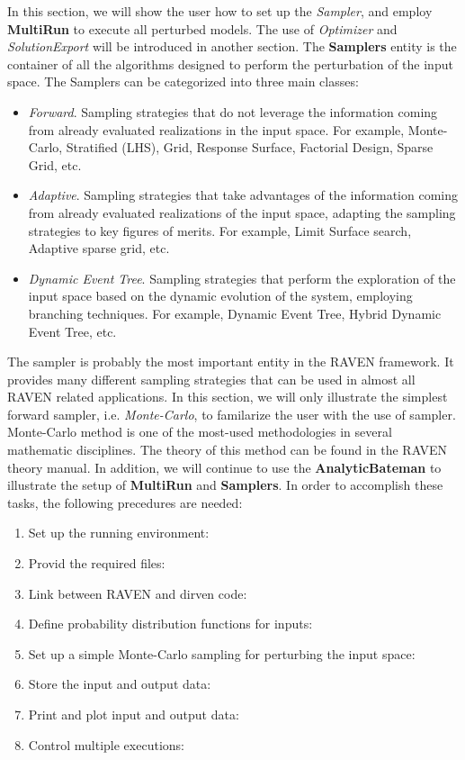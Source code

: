 In this section, we will show the user how to set up the \textit{Sampler}, and employ \textbf{MultiRun} to execute
all perturbed models. The use of \textit{Optimizer} and \textit{SolutionExport} will be introduced in another section.
The \textbf{Samplers}  entity is the container of all the algorithms designed to perform the perturbation of the
input space. The Samplers can be categorized into three main classes:

\begin{itemize}
  \item  \textit{Forward}. Sampling strategies that do not leverage the information coming from already evaluated
    realizations in the input space. For example, Monte-Carlo, Stratified (LHS), Grid, Response Surface, Factorial Design,
    Sparse Grid, etc.
  \item  \textit{Adaptive}. Sampling strategies that take advantages of the information coming from already evaluated
    realizations of the input space, adapting the sampling strategies to key figures of merits. For example, Limit Surface
    search, Adaptive sparse grid, etc.
  \item \textit{Dynamic Event Tree}. Sampling strategies that perform the exploration of the input space based on the
    dynamic evolution of the system, employing branching techniques. For example, Dynamic Event Tree, Hybrid
    Dynamic Event Tree, etc.
\end{itemize}

The sampler is probably the most important entity in the RAVEN framework. It provides many different sampling
strategies that can be used in almost all RAVEN related applications. In this section, we will only illustrate
the simplest forward sampler, i.e. \textit{Monte-Carlo}, to familarize the user with the use of sampler. Monte-Carlo method
is one of the most-used methodologies in several mathematic disciplines. The theory of this method can be found in
the RAVEN theory manual. In addition, we will continue to use the \textbf{AnalyticBateman} to illustrate the setup
of \textbf{MultiRun} and \textbf{Samplers}. In order to accomplish these tasks, the following precedures are needed:

\begin{enumerate}
  \item Set up the running environment: 
  \item Provid the required files: 
  \item Link between RAVEN and dirven code: 
  \item Define probability distribution functions for inputs: 
  \item Set up a simple Monte-Carlo sampling for perturbing the input space: 
  \item Store the input and output data: 
  \item Print and plot input and output data: 
  \item Control multiple executions: 
\end{enumerate}

